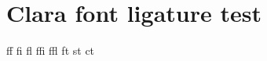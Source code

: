 \documentclass{article}
\begin{document}
\section*{Clara font ligature test}

ff fi fl ffi ffl ft st ct
\end{document}
